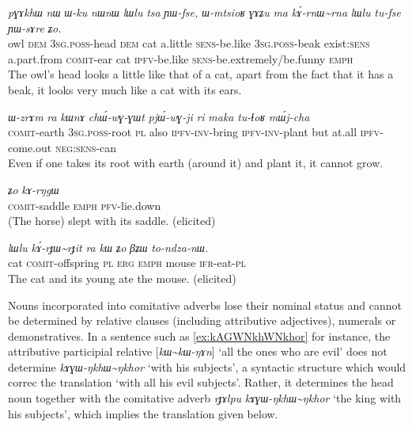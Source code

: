\documentclass[oldfontcommands,oneside,a4paper,11pt]{article}
\newcommand{\ipa}[1]{{\phon\textit{#1}}} %
\newcommand{\tld}{\textasciitilde{}}
\begin{document}
\begin{exe}
\ex \label{ex:kArnWrna}
\gll
\ipa{pɣɤkhɯ}  	\ipa{nɯ}  	\ipa{ɯ-ku}  	\ipa{nɯnɯ}  	\ipa{lɯlu}  	\ipa{tsa}  	\ipa{ɲɯ-fse,}  	\ipa{ɯ-mtsioʁ}  	\ipa{ɣɤʑu}  	\ipa{ma}  \ipa{kɤ́-rnɯ\tld{}rna}  	\ipa{lɯlu}  	\ipa{tu-fse}  	\ipa{ɲɯ-sɤre}  	\ipa{ʑo.}  \\
owl \textsc{dem} \textsc{3sg.poss}-head \textsc{dem} cat a.little \textsc{sens}-be.like \textsc{3sg.poss}-beak exist:\textsc{sens} a.part.from \textsc{comit}-ear cat \textsc{ipfv}-be.like \textsc{sens}-be.extremely/be.funny \textsc{emph} \\
\glt The owl's head looks a little like that of a cat, apart from the fact that it has a beak, it looks very much like a cat with its ears.
\end{exe}


\begin{exe}
\ex \label{ex:kAthAlwWlwa}
\gll \ipa{kɤ́-thɤlwɯ\tld{}lwa}  	\ipa{ɯ-zrɤm}  	\ipa{ra}  	\ipa{kɯnɤ}  	\ipa{chɯ́-wɣ-ɣɯt}  	\ipa{pjɯ́-wɣ-ji}  	\ipa{ri}  	\ipa{maka}  	\ipa{tu-ɬoʁ}  	\ipa{mɯ́j-cha}  \\
\textsc{comit}-earth \textsc{3sg.poss}-root \textsc{pl} also \textsc{ipfv-inv}-bring \textsc{ipfv-inv}-plant but at.all \textsc{ipfv}-come.out \textsc{neg:sens}-can \\
\glt Even if one takes its root with earth (around it) and plant it, it cannot grow.
\end{exe}


\begin{exe}
\ex \label{ex:kAsnWsno}
\gll \ipa{kɤ́-snɯ\tld{}sno}  	\ipa{ʑo}  	\ipa{kɤ-rŋgɯ}  \\
\textsc{comit}-saddle \textsc{emph} \textsc{pfv}-lie.down \\
\glt (The horse) slept with its saddle. (elicited)
\end{exe}

\begin{exe}
\ex \label{ex:kArJWrJit.kW}
\gll 
\ipa{lɯlu} 	\ipa{kɤ́-rɟɯ\tld{}rɟit} 	\ipa{ra} 	\ipa{kɯ} 	\ipa{ʑo} 	\ipa{βʑɯ} 	\ipa{to-ndza-nɯ.} \\
cat \textsc{comit}-offspring \textsc{pl}  \textsc{erg} \textsc{emph} mouse \textsc{ifr}-eat-\textsc{pl} \\
\glt The cat and its young ate the mouse. (elicited)
\end{exe}

Nouns incorporated into comitative adverbs lose their nominal status and cannot be determined by relative clauses (including attributive adjectives), numerals or demonstratives. In a sentence such as \ref{ex:kAGWNkhWNkhor} for instance, the attributive participial relative [\ipa{kɯ\tld{}kɯ-ŋɤn}] `all the ones who are evil' does not determine \ipa{kɤɣɯ-ŋkhɯ\tld{}ŋkhor} `with his subjects', a syntactic structure which would correc the translation `with all his evil subjects'. Rather, it determines the head noun together with the comitative adverb  \ipa{rɟɤlpu} \ipa{kɤɣɯ-ŋkhɯ\tld{}ŋkhor} `the king with his subjects', which implies the translation given below.
\end{document}
